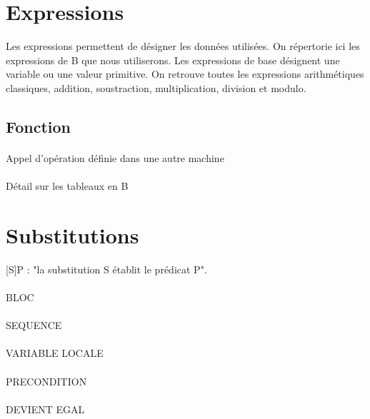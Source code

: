 \section{Expressions}

Les expressions permettent de désigner les données utilisées. On
répertorie ici les expressions de B que nous utiliserons. Les
expressions de base désignent une variable ou une valeur primitive.
On retrouve toutes les expressions arithmétiques classiques, addition,
soustraction, multiplication, division et modulo.

\subsection{Fonction}


\paragraph{}
Appel d'opération définie dans une autre machine

\paragraph{}
Détail sur les tableaux en B


\section{Substitutions}
[S]P : "la substitution S établit le prédicat P".

\paragraph{}
BLOC

\paragraph{}
SEQUENCE

\paragraph{}
VARIABLE LOCALE

\paragraph{}
PRECONDITION

\paragraph{}
DEVIENT EGAL

